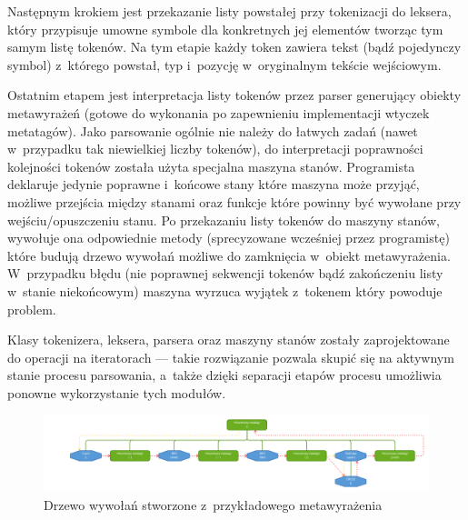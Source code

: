 \par
Następnym krokiem jest przekazanie listy powstałej przy tokenizacji do leksera, który przypisuje umowne symbole dla konkretnych jej elementów tworząc tym samym listę tokenów. Na tym etapie każdy token zawiera tekst (bądź pojedynczy symbol) z~którego powstał, typ i~pozycję w~oryginalnym tekście wejściowym.

\par
Ostatnim etapem jest interpretacja listy tokenów przez parser generujący obiekty metawyrażeń (gotowe do wykonania po zapewnieniu implementacji wtyczek metatagów).
Jako parsowanie ogólnie nie należy do łatwych zadań (nawet w~przypadku tak niewielkiej liczby tokenów), do interpretacji poprawności kolejności tokenów została użyta specjalna maszyna stanów.
Programista deklaruje jedynie poprawne i~końcowe stany które maszyna może przyjąć, możliwe przejścia między stanami oraz funkcje które powinny być wywołane przy wejściu/opuszczeniu stanu.
Po przekazaniu listy tokenów do maszyny stanów, wywołuje ona odpowiednie metody (sprecyzowane wcześniej przez programistę) które budują drzewo wywołań możliwe do zamknięcia w~obiekt metawyrażenia.
 W~przypadku błędu (nie poprawnej sekwencji tokenów bądź zakończeniu listy w~stanie niekońcowym) maszyna wyrzuca wyjątek z~tokenem który powoduje problem.

\par
Klasy tokenizera, leksera, parsera oraz maszyny stanów zostały zaprojektowane do operacji na iteratorach --- takie rozwiązanie pozwala skupić się na aktywnym stanie procesu parsowania, a~także dzięki separacji etapów procesu umożliwia ponowne wykorzystanie tych modułów.

\begin{figure}
\begin{center}
\includegraphics[scale=0.55]{img/metatag_expr_tree4.png}
\end{center}
\caption{Drzewo wywołań stworzone z~przykładowego metawyrażenia}
\label{metatag-expr-tree}
\end{figure}

